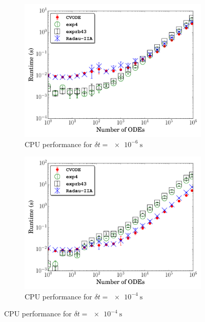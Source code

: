 \documentclass[preprint]{elsarticle}
\begin{document}
\begin{figure}[htb]
  \centering
  \begin{subfigure}{0.49\textwidth}
      \includegraphics[width=\linewidth]{H2_1e-06_cpu_nonorm.pdf}
      \caption{CPU performance for $\delta t = \SI{e-6}{\second}$}
  \end{subfigure}
  \begin{subfigure}{0.49\textwidth}
      \includegraphics[width=\linewidth]{H2_1e-04_cpu_nonorm.pdf}
      \caption{CPU performance for $\delta t = \SI{e-4}{\second}$}
 

\end{subfigure}
\end{figure}
\end{document}
